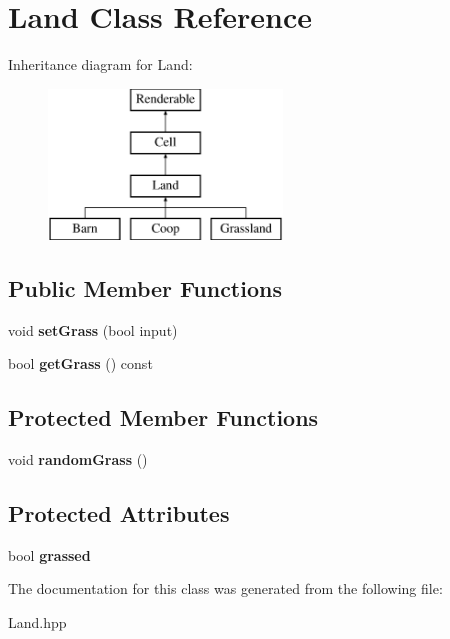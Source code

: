 \hypertarget{class_land}{}\section{Land Class Reference}
\label{class_land}
Inheritance diagram for Land\+:\begin{figure}[H]
\begin{center}
\leavevmode
\includegraphics[height=4.000000cm]{class_land}
\end{center}
\end{figure}
\subsection*{Public Member Functions}
\begin{DoxyCompactItemize}
\item 
\mbox{\label{class_land_a87db2308a5bc6e9d95905db6d041483b}} 
void {\bfseries set\+Grass} (bool input)
\item 
\mbox{\label{class_land_ac406e3943c569a8b21263825d68edb31}} 
bool {\bfseries get\+Grass} () const
\end{DoxyCompactItemize}
\subsection*{Protected Member Functions}
\begin{DoxyCompactItemize}
\item 
\mbox{\label{class_land_a6657c5bf928092c71de132caeac88f39}} 
void {\bfseries random\+Grass} ()
\end{DoxyCompactItemize}
\subsection*{Protected Attributes}
\begin{DoxyCompactItemize}
\item 
\mbox{\label{class_land_ad9ab8673faf16debea9650bac6565737}} 
bool {\bfseries grassed}
\end{DoxyCompactItemize}


The documentation for this class was generated from the following file\+:\begin{DoxyCompactItemize}
\item 
Land.\+hpp\end{DoxyCompactItemize}

